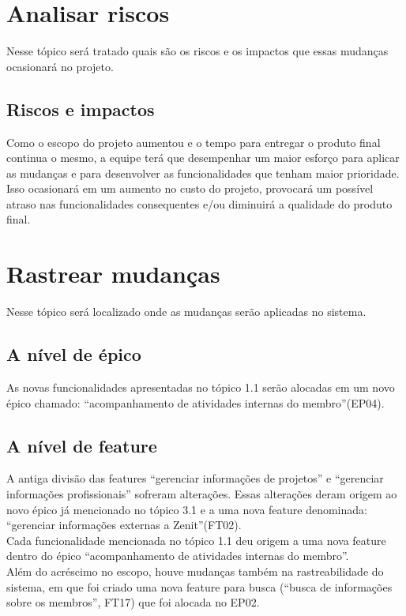 \begin{anexosenv}
\section[Analisar riscos]{Analisar riscos}

Nesse tópico será tratado quais são os riscos e os impactos que essas mudanças ocasionará no projeto.\\

\subsection[Riscos e impactos]{Riscos e impactos}

Como o escopo do projeto aumentou e o tempo para entregar o produto final continua o mesmo, a equipe terá que desempenhar um maior esforço para aplicar as mudanças e para desenvolver as funcionalidades que tenham maior prioridade. Isso ocasionará em um aumento no custo do projeto,  provocará um possível atraso nas funcionalidades consequentes e/ou diminuirá a qualidade do produto final.\\

\section[Rastrear mudanças]{Rastrear mudanças}

Nesse tópico será localizado onde as mudanças serão aplicadas no sistema.\\

\subsection[A nível de épico]{A nível de épico}
    
As novas funcionalidades apresentadas no tópico 1.1 serão alocadas em um novo épico chamado: “acompanhamento de atividades internas do membro”(EP04).\\
    
\subsection[A nível de feature]{A nível de feature}

A antiga divisão das features “gerenciar informações de projetos” e “gerenciar informações profissionais” sofreram alterações. Essas alterações deram origem ao novo épico já mencionado no tópico 3.1 e a uma nova feature denominada: “gerenciar informações externas a Zenit”(FT02).\\
Cada funcionalidade mencionada no tópico 1.1 deu origem a uma nova feature dentro do épico “acompanhamento de atividades internas do membro”.\\
Além do acréscimo no escopo, houve mudanças também na rastreabilidade do sistema, em que foi criado uma nova feature para busca (“busca de informações sobre os membros”, FT17) que foi alocada no EP02.\\


\end{anexosenv}
